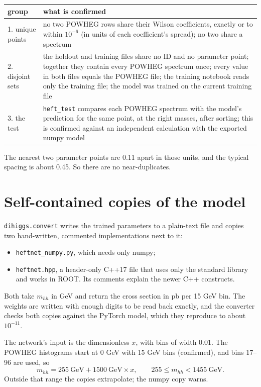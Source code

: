 \documentclass[11pt]{article}
\newcommand{\file}[1]{\nolinkurl{#1}}
\newcommand{\code}[1]{\texttt{#1}}
\newcommand{\mhh}{m_{hh}}
\begin{document}
\begin{center}
\small
\begin{tabular}{lp{}}
\toprule
group & what is confirmed\\
\midrule
1. unique points & no two POWHEG rows share their Wilson coefficients, exactly or to within $10^{-6}$ (in units of each coefficient's spread); no two share a spectrum\\
2. disjoint sets & the holdout and training files share no ID and no parameter point; together they contain every POWHEG spectrum once; every value in both files equals the POWHEG file; the training notebook reads only the training file; the model was trained on the current training file\\
3. the test & \code{heft\_test} compares each POWHEG spectrum with the model's prediction for the same point, at the right masses, after sorting; this is confirmed against an independent calculation with the exported numpy model\\
\bottomrule
\end{tabular}
\end{center}

The nearest two parameter points are 0.11 apart in those units, and the typical
spacing is about 0.45. So there are no near-duplicates.

\section{Self-contained copies of the model}
\label{sec:export}

\code{dihiggs.convert} writes the trained parameters to a plain-text file and copies
two hand-written, commented implementations next to it:
\begin{itemize}
  \item \file{heftnet_numpy.py}, which needs only numpy;
  \item \file{heftnet.hpp}, a header-only C++17 file that uses only the standard
  library and works in ROOT. Its comments explain the newer C++ constructs.
\end{itemize}
Both take $\mhh$ in GeV and return the cross section in pb per 15 GeV bin. The weights
are written with enough digits to be read back exactly, and the converter checks both
copies against the PyTorch model, which they reproduce to about $10^{-11}$.

\begin{assume}
The network's input is the dimensionless $x$, with bins of width 0.01. The POWHEG
histograms start at 0 GeV with 15 GeV bins (confirmed), and bins 17--96 are used, so
\[
  \mhh = 255~\text{GeV} + 1500~\text{GeV} \times x , \qquad 255 \le \mhh < 1455~\text{GeV}.
\]
Outside that range the copies extrapolate; the numpy copy warns.
\end{assume}
\end{document}
